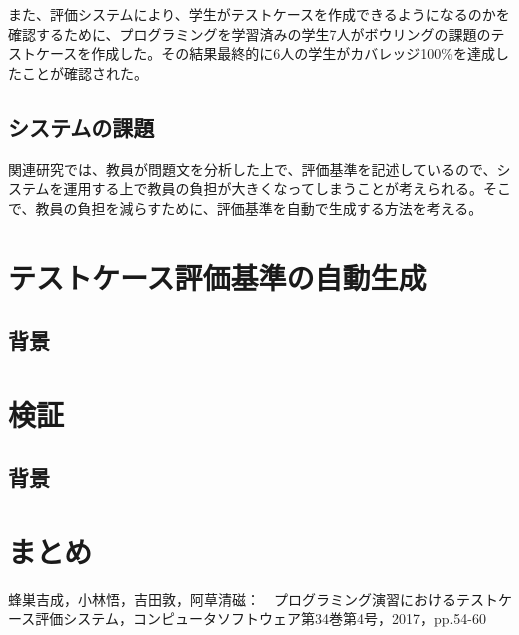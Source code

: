 \documentclass{tpu-sotu}
\begin{document}
また、評価システムにより、学生がテストケースを作成できるようになるのかを確認するために、プログラミングを学習済みの学生7人がボウリングの課題のテストケースを作成した。その結果最終的に6人の学生がカバレッジ100\%を達成したことが確認された。
\section{システムの課題}
関連研究では、教員が問題文を分析した上で、評価基準を記述しているので、システムを運用する上で教員の負担が大きくなってしまうことが考えられる。そこで、教員の負担を減らすために、評価基準を自動で生成する方法を考える。
\chapter{テストケース評価基準の自動生成}
\section{背景}
\chapter{検証}
\section{背景}
\chapter{まとめ}
\acknowledgements
\begin{thebibliography}{1}
    蜂巣吉成，小林悟，吉田敦，阿草清磁：　プログラミング演習におけるテストケース評価システム，コンピュータソフトウェア第34巻第4号，2017，pp.54-60
\end{thebibliography}
\end{document}
